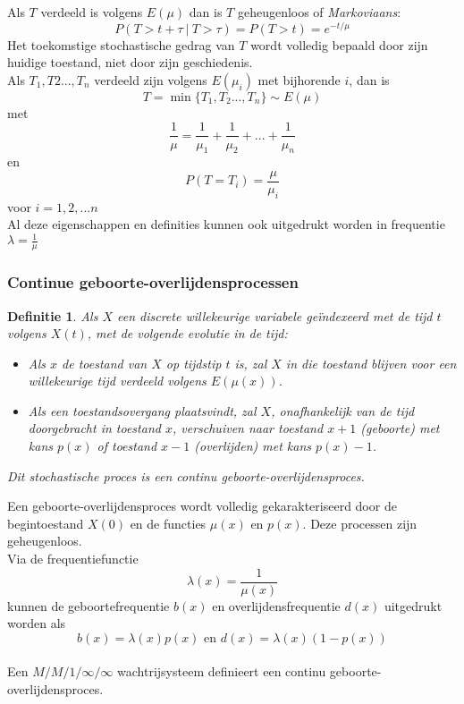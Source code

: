 \documentclass{article}
\newtheorem{mydef}{Definitie}
\begin{document}
	Als $T$ verdeeld is volgens $E(\mu)$ dan is $T$ geheugenloos of \textit{Markoviaans}:
	$$
		P(T>t+\tau\ |\ T >\tau) = P(T>t) = e^{-t/\mu}
	$$
	Het toekomstige stochastische gedrag van $T$ wordt volledig bepaald door zijn huidige toestand, niet door zijn geschiedenis.\\
	
	Als $T_1, T2...,T_n$ verdeeld zijn volgens $E(\mu_i)$ met bijhorende $i$, dan is
	$$
		T = \min\{T_1, T_2...,T_n\} \sim E(\mu)
	$$
	met
	$$
		\frac{1}{\mu} = \frac{1}{\mu_1} + \frac{1}{\mu_2} + ... + \frac{1}{\mu_n}
	$$
	en
	$$
		P(T=T_i) = \frac{\mu}{\mu_i}
	$$
	voor $i=1,2,...n$
	\\
	
	Al deze eigenschappen en definities kunnen ook uitgedrukt worden in frequentie $\lambda = \frac{1}{\mu}$
	
	\subsubsection{Continue geboorte-overlijdensprocessen}
	
	\begin{mydef}
		Als $X$ een discrete willekeurige variabele geïndexeerd met de tijd $t$ volgens $X(t)$, met de volgende evolutie in de tijd:
		\begin{itemize}
			\item Als $x$ de toestand van $X$ op tijdstip $t$ is, zal $X$ in die toestand blijven voor een willekeurige tijd verdeeld volgens $E(\mu(x))$.
			\item Als een toestandsovergang plaatsvindt, zal $X$, onafhankelijk van de tijd doorgebracht in toestand $x$, verschuiven naar toestand $x+1$ (geboorte) met kans $p(x)$ of toestand $x-1$ (overlijden) met kans $p(x)-1$.
		\end{itemize}
		Dit stochastische proces is een continu geboorte-overlijdensproces.
	\end{mydef}

	Een geboorte-overlijdensproces wordt volledig gekarakteriseerd door de begintoestand $X(0)$ en de functies $\mu(x)$ en $p(x)$. Deze processen zijn geheugenloos.\\
	
	Via de frequentiefunctie
	$$
		\lambda(x) = \frac{1}{\mu(x)}
	$$
	kunnen de geboortefrequentie $b(x)$ en overlijdensfrequentie $d(x)$ uitgedrukt worden als
	$$
		b(x) = \lambda(x)p(x) \text{\ \ \ \ \ en\ \ \ \ } d(x) = \lambda(x)(1-p(x))
	$$
	\\
	Een $M/M/1/\infty/\infty$ wachtrijsysteem definieert een continu geboorte-overlijdensproces.
	
\end{document}
